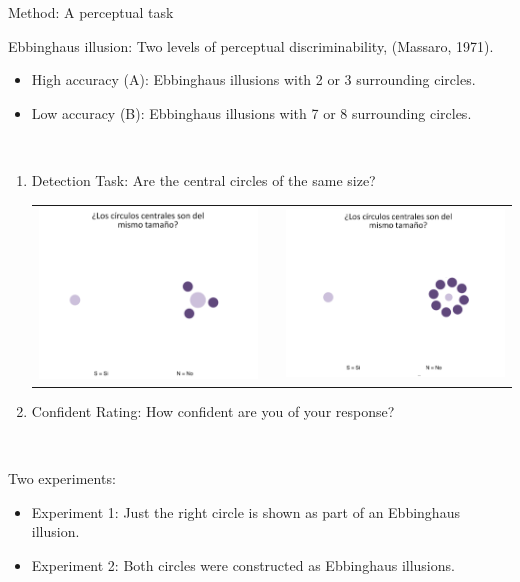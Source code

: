 \documentclass[final]{beamer}
\newlength{\onecolwid}
\begin{document}
\begin{frame}[t]
\begin{columns}[t]
\begin{column}{\onecolwid}
\begin{alertblock}{Method: A perceptual task}

Ebbinghaus illusion: Two levels of perceptual discriminability, (Massaro, 1971).

\begin{itemize}
\item High accuracy (A): Ebbinghaus illusions with 2 or 3 surrounding circles.
\item Low accuracy (B): Ebbinghaus illusions with 7 or 8 surrounding circles.
\end{itemize}

$\quad$
\begin{enumerate}
\item Detection Task: Are the central circles of the same size?
\begin{center}
\begin{tabular}{ccc}
\includegraphics[width=0.45\linewidth]{Figures/MainTask.png} & \hfill & \includegraphics[width=0.4\linewidth]{Figures/MainTask2.png}
\end{tabular}
\end{center}
\item Confident Rating: How confident are you of your response?
\end{enumerate}
$\qquad$

Two experiments: 

\begin{itemize}
\item Experiment 1: Just the right circle is shown as part of an Ebbinghaus illusion.
\item Experiment 2: Both circles were constructed as Ebbinghaus illusions.
\end{itemize}


\end{alertblock}
\end{column}
\end{columns}
\end{frame}
\end{document}

